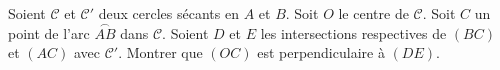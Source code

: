 Soient $\mathcal{C}$ et $\mathcal{C}'$ deux cercles sécants en $A$ et $B$. Soit $O$ le centre de $\mathcal{C}$. Soit $C$ un point de l'arc $\overset{\frown}{AB}$ dans $\mathcal{C}$. Soient $D$ et $E$ les intersections respectives de $(BC)$ et $(AC)$ avec $\mathcal{C}'$. Montrer que $(OC)$ est perpendiculaire à $(DE)$.
